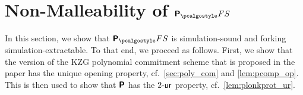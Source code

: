 \documentclass[runningheads,11pt]{llncs}
\begin{document}


\section{Non-Malleability of $\plonkprotfs$} 
\label{sec:plonk}
In this section, we show that $\plonkprotfs$ is simulation-sound and forking simulation-extractable. To that
end, we proceed as follows. First, we show that the version of the KZG polynomial
commitment scheme that is proposed in the \plonk{} paper has the unique opening
property, cf.~\cref{sec:poly_com} and \cref{lem:pcomp_op}. This is then
used to show that $\bm{\mathsf{P}}$ has the ${2\text{-}\mathsf{ur}}$ property,
cf.~\cref{lem:plonkprot_ur}.
\end{document}
